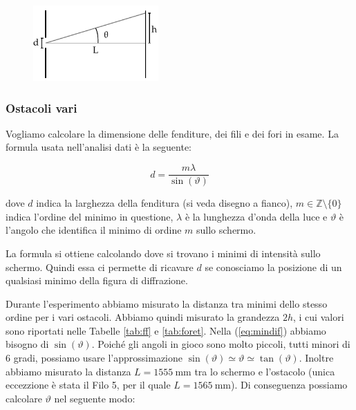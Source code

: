 \begin{figure}
    \vspace{-5mm}
    \begin{center}
        \includegraphics[width=48mm]{fen.pdf}
    \end{center}
    \vspace{-2mm}
\end{figure}

\subsubsection{Ostacoli vari}

Vogliamo calcolare la dimensione delle fenditure, dei fili e dei fori in esame.
La formula usata nell'analisi dati è la seguente:

\begin{equation}
    d = \frac{m\lambda}{\sin(\vartheta)}
    \label{eq:mindif}
\end{equation}

dove $d$ indica la larghezza della fenditura (si veda disegno a fianco),
$m \in \mathbb{Z} \setminus \{0\}$ indica l'ordine del minimo in questione,
$\lambda$ è la lunghezza d'onda della luce e $\vartheta$ è l'angolo che identifica
il minimo di ordine $m$ sullo schermo.

La formula si ottiene calcolando dove si trovano i minimi di intensità sullo schermo.
Quindi essa ci permette di ricavare $d$ se conosciamo la posizione di un qualsiasi minimo
della figura di diffrazione.

Durante l'esperimento abbiamo misurato la distanza tra minimi dello stesso ordine per i vari ostacoli.
Abbiamo quindi misurato la grandezza $2h$, i cui valori sono riportati nelle Tabelle \ref{tab:ff} e \ref{tab:foret}.
Nella (\ref{eq:mindif}) abbiamo bisogno di $\sin(\vartheta)$. Poiché gli angoli in gioco sono molto piccoli, tutti minori
di 6 gradi, possiamo usare l'approssimazione $\sin(\vartheta) \simeq \vartheta \simeq \tan(\vartheta)$. Inoltre abbiamo
misurato la distanza $L = \SI{1555}{\milli\metre}$ tra lo schermo e l'ostacolo (unica eccezzione è stata il Filo 5, per
il quale $L = \SI{1565}{\milli\metre}$). Di conseguenza possiamo calcolare $\vartheta$ nel seguente modo:

